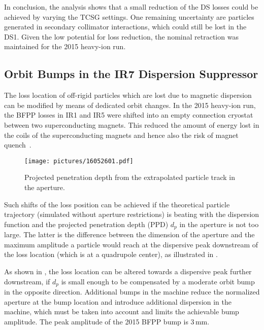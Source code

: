 In conclusion, the analysis shows that a small reduction of the DS losses could be achieved by varying the TCSG settings. One remaining uncertainty are particles generated in secondary collimator interactions, which could still be lost in the DS1. Given the low potential for loss reduction, the nominal retraction was maintained for the 2015 heavy-ion run.



\subsection{Orbit Bumps in the IR7 Dispersion Suppressor} \label{chap:orbump}


The loss location of off-rigid particles which are lost due to magnetic dispersion can be modified by means of dedicated orbit changes. In the 2015 heavy-ion run, the BFPP losses in IR1 and IR5 were shifted into an empty connection cryostat between two superconducting magnets. This reduced the amount of energy lost in the coils of the superconducting magnets and hence also the risk of magnet quench~\cite{PRSTAB:12:071002,IPAC16:TUPMW028}. 

\begin{figure}[b]  
    \centering
    \texttt{[image: pictures/16052601.pdf]}
    \caption{Projected penetration depth from the extrapolated particle track in the aperture.}  
    \label{pic:16052601}
\end{figure}

Such shifts of the loss position can be achieved if the theoretical particle trajectory (simulated without aperture restrictions) is beating with the dispersion function and the projected penetration depth (PPD) $d_p$ in the aperture is not too large. The latter is the difference between the dimension of the aperture and the maximum amplitude a particle would reach at the dispersive peak downstream of the loss location (which is at a quadrupole center), as illustrated in . 

\newpage
As shown in , the loss location can be altered towards a dispersive peak further downstream, if $d_p$ is small enough to be compensated by a moderate orbit bump in the opposite direction. Additional bumps in the machine reduce the normalized aperture at the bump location and introduce additional dispersion in the machine, which must be taken into account and limits the achievable bump amplitude. The peak amplitude of the 2015 BFPP bump is $3\,$mm. 

